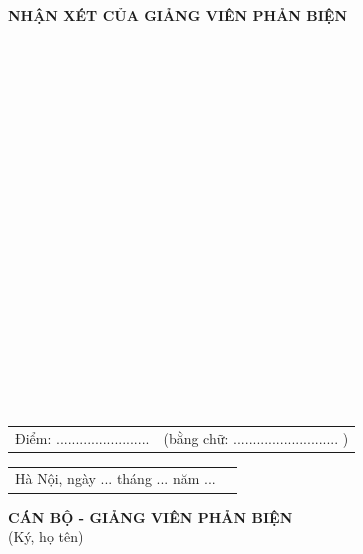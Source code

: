 \documentclass[../BTL.tex]{subfiles}
\begin{document}
\thispagestyle{empty}

\begin{center}
\textbf{NHẬN XÉT CỦA GIẢNG VIÊN PHẢN BIỆN}
\end{center}

\vspace{0.5cm}

\begin{center}
\dotfill\\
\dotfill\\
\dotfill\\
\dotfill\\
\dotfill\\
\dotfill\\
\dotfill\\
\dotfill\\
\dotfill\\
\dotfill\\
\dotfill\\
\dotfill\\
\dotfill\\
\dotfill\\
\dotfill\\
\dotfill\\
\dotfill\\
\dotfill\\
\dotfill\\
\end{center}

\vspace{0.5cm}

\begin{tabular}{@{}l l@{}}
Điểm: ........................ & (bằng chữ: ........................... ) \\
\end{tabular}

\vspace{1cm}

\begin{tabular}{@{}l r@{}}
Hà Nội, ngày ... tháng ... năm ... & \\
\end{tabular}

\vspace{1cm}

\begin{center}
\textbf{CÁN BỘ - GIẢNG VIÊN PHẢN BIỆN}\\
(Ký, họ tên)
\end{center}
\end{document}
